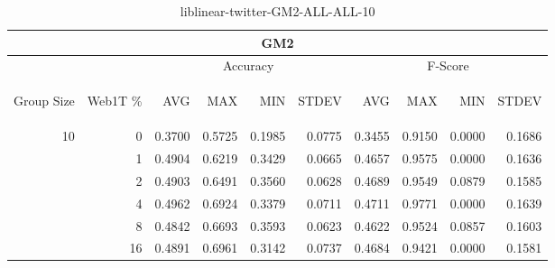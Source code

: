 \begin{center}
\begin{table}[htbp] 
 \begin{center}
\begin{tabular}{ | r | r | r | r | r | r | r | r | r | r |}
\hline
\multicolumn{10}{|c|}{GM2}\\
\hline
 & & \multicolumn{4}{|c|}{Accuracy} & \multicolumn{4}{|c|}{F-Score}\\ \cline{3-10}
\begin{sideways}Group Size\end{sideways} & \begin{sideways}Web1T \%\end{sideways} & \begin{sideways}AVG\end{sideways} & \begin{sideways}MAX\end{sideways} & \begin{sideways}MIN\end{sideways} & \begin{sideways}STDEV\end{sideways} & \begin{sideways}AVG\end{sideways} & \begin{sideways}MAX\end{sideways} & \begin{sideways}MIN\end{sideways} & \begin{sideways}STDEV\end{sideways}\\
\hline
\multirow{5}{*}{10}
 & 0 & 0.3700 & 0.5725 & 0.1985 & 0.0775 & 0.3455 & 0.9150 & 0.0000 & 0.1686\\ \cline{2-10}
 & 1 & 0.4904 & 0.6219 & 0.3429 & 0.0665 & 0.4657 & 0.9575 & 0.0000 & 0.1636\\ \cline{2-10}
 & 2 & 0.4903 & 0.6491 & 0.3560 & 0.0628 & 0.4689 & 0.9549 & 0.0879 & 0.1585\\ \cline{2-10}
 & 4 & 0.4962 & 0.6924 & 0.3379 & 0.0711 & 0.4711 & 0.9771 & 0.0000 & 0.1639\\ \cline{2-10}
 & 8 & 0.4842 & 0.6693 & 0.3593 & 0.0623 & 0.4622 & 0.9524 & 0.0857 & 0.1603\\ \cline{2-10}
 & 16 & 0.4891 & 0.6961 & 0.3142 & 0.0737 & 0.4684 & 0.9421 & 0.0000 & 0.1581\\ \cline{2-10}
\hline
\end{tabular}
\caption{liblinear-twitter-GM2-ALL-ALL-10}
\label{table:liblinear-twitter-GM2-ALL-ALL-10}
\end{center}
 \end{table}
\end{center}

